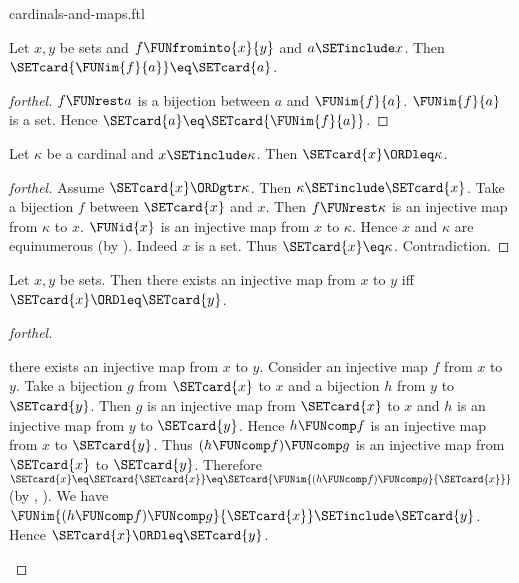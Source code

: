 \documentclass{stex}
\begin{document}
\begin{smodule}{cardinals-and-maps.ftl}

\begin{proposition}[forthel,id=SET_THEORY_06_5513850721927168]
  Let $x, y$ be sets and $f \FUNfrominto{x}{y}$ and $a \SETinclude x$.
  Then $\SETcard{\FUNim{f}{a}} \eq \SETcard{a}$.
\end{proposition}
\begin{proof}[forthel]
  $f \FUNrest a$ is a bijection between $a$ and $\FUNim{f}{a}$.
  $\FUNim{f}{a}$ is a set.
  Hence $\SETcard{a} \eq \SETcard{\FUNim{f}{a}}$.
\end{proof}

\begin{proposition}[forthel,id=SET_THEORY_06_6702394681735923]
  Let $\kappa$ be a cardinal and $x \SETinclude \kappa$.
  Then $\SETcard{x} \ORDleq \kappa$.
\end{proposition}
\begin{proof}[forthel]
  Assume $\SETcard{x} \ORDgtr \kappa$.
  Then $\kappa \SETinclude \SETcard{x}$.
  Take a bijection $f$ between $\SETcard{x}$ and $x$.
  Then $f \FUNrest \kappa$ is an injective map from $\kappa$ to $x$.
  $\FUNid{x}$ is an injective map from $x$ to $\kappa$.
  Hence $x$ and $\kappa$ are equinumerous (by ).
  Indeed $x$ is a set.
  Thus $\SETcard{x} \eq \kappa$.
  Contradiction.
\end{proof}

\begin{proposition}[forthel,id=SET_THEORY_06_407116133171200]
  Let $x, y$ be sets.
  Then there exists an injective map from $x$ to $y$ iff $\SETcard{x} \ORDleq \SETcard{y}$.
\end{proposition}
\begin{proof}[forthel]
  \begin{case}{there exists an injective map from $x$ to $y$.}
    Consider an injective map $f$ from $x$ to $y$.
    Take a bijection $g$ from $\SETcard{x}$ to $x$ and a bijection $h$ from $y$ to $\SETcard{y}$.
    Then $g$ is an injective map from $\SETcard{x}$ to $x$ and $h$ is an injective map from $y$ to $\SETcard{y}$.
    Hence $h \FUNcomp f$ is an injective map from $x$ to $\SETcard{y}$.
    Thus $(h \FUNcomp f) \FUNcomp g$ is an injective map from $\SETcard{x}$ to $\SETcard{y}$.
    Therefore $\SETcard{x}
      \eq \SETcard{\SETcard{x}}
      \eq \SETcard{\FUNim{(h \FUNcomp f) \FUNcomp g}{\SETcard{x}}}$
    (by , ).
    We have $\FUNim{(h \FUNcomp f) \FUNcomp g}{\SETcard{x}} \SETinclude \SETcard{y}$.
    Hence $\SETcard{x} \ORDleq \SETcard{y}$.
  \end{case}


\end{proof}
\end{smodule}
\end{document}
